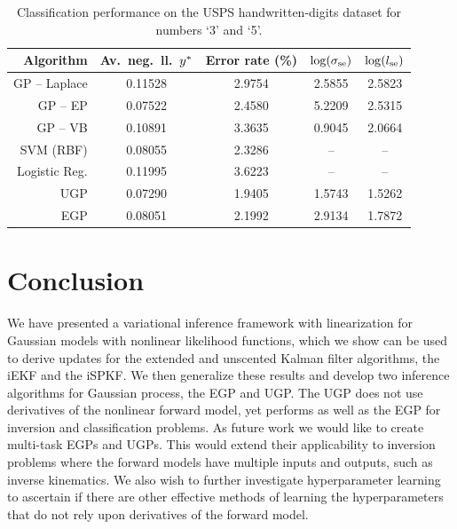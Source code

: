 \documentclass{article} %
\begin{document}
\begin{table}[tb]
    \centering
    \caption[]{Classification performance on the USPS handwritten-digits
        dataset for numbers `3' and `5'.}
    \footnotesize
    \begin{tabular}{r| c c c c}
        Algorithm & Av.\ neg.\ ll.\ $y^{*}$ & Error rate (\%) 
            & $\log\!\left({\sigma_\text{se}}\right)$ & $\log\!\left({l_\text{se}}\right)$ \\
        \toprule
        GP -- Laplace & 0.11528 & 2.9754 & 2.5855 & 2.5823 \\
        GP -- EP & 0.07522 & 2.4580 & 5.2209 & 2.5315 \\
        GP -- VB & 0.10891 & 3.3635 & 0.9045 & 2.0664 \\ 
        SVM (RBF) & 0.08055 & 2.3286 & -- & -- \\
        Logistic Reg. & 0.11995 & 3.6223 & -- & -- \\
        \midrule
        UGP & 0.07290 & 1.9405 & 1.5743 & 1.5262 \\
        EGP & 0.08051 & 2.1992 & 2.9134 & 1.7872 \\
        \bottomrule
    \end{tabular}
    \label{tab:class}
\end{table}


\section{Conclusion}

We have presented a variational inference framework with linearization for
Gaussian models with nonlinear likelihood functions, which we show can be used
to derive updates for the extended and unscented Kalman filter algorithms, the
iEKF and the iSPKF. We then generalize these results and develop two inference
algorithms for Gaussian process, the EGP and UGP. The UGP does not use
derivatives of the nonlinear forward model, yet performs as well as the EGP for
inversion and classification problems. As future work we would like to create
multi-task EGPs and UGPs. This would extend their applicability to inversion
problems where the forward models have multiple inputs and outputs, such as
inverse kinematics. We also wish to further investigate hyperparameter learning
to ascertain if there are other effective methods of learning the
hyperparameters that do not rely upon derivatives of the forward model. 


 





\end{document}
